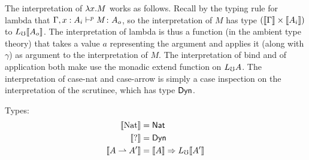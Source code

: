 The interpretation of $\lambda {x} . {M}$ works as follows. Recall by the typing rule for
lambda that ${\Gamma, x : A_i} \vdash^p {M} \colon {{A_o}}$, so the interpretation of $M$
has type $(\llbracket {\Gamma} \rrbracket \times \llbracket {A_i} \rrbracket)$ to $L_\mho \llbracket {A_o} \rrbracket$.
The interpretation of lambda is thus a function (in the ambient type theory) that takes
a value $a$ representing the argument and applies it (along with $\gamma$) as argument to
the interpretation of $M$.
%
The interpretation of bind and of application both make use the monadic extend function on $L_\mho A$.
%
The interpretation of case-nat and case-arrow is simply a case inspection on the
interpretation of the scrutinee, which has type $\mathsf{Dyn}$.


\vspace{2ex}


\noindent Types:
\begin{align*}
  \llbracket {\text{Nat}} \rrbracket &= \mathsf{Nat} \\
  \llbracket {?} \rrbracket &= \mathsf{Dyn} \\
  \llbracket {A \rightharpoonup A'} \rrbracket &= \llbracket {A} \rrbracket \Rightarrow L_\mho \llbracket {A'} \rrbracket \\
\end{align*}


